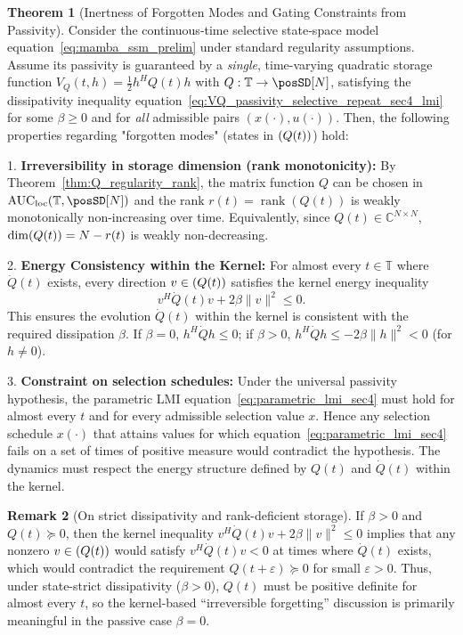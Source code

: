 \documentclass[10pt]{article} %
\def\eqref#1{equation~\ref{#1}}
\newcommand{\timeInt}{\mathbb T}                        %
\newcommand{\loc}{\mathrm{loc}}                         %
\let\ker\relax\DeclareMathOperator{\ker}{Ker}           %
\DeclareMathOperator{\AUC}{AUC}                         %
\DeclareMathOperator{\rank}{rank}                       %
\theoremstyle{definition}
\newtheorem{theorem}{Theorem}[section]
\newtheorem{remark}[theorem]{Remark}
\begin{document}
\begin{theorem}[Inertness of Forgotten Modes and Gating Constraints from Passivity]
\label{thm:kernel_inertness_sec4} %
Consider the continuous‐time selective state‐space model \eqref{eq:mamba_ssm_prelim} under standard regularity assumptions. Assume its passivity is guaranteed by a \emph{single}, time-varying quadratic storage function
$V_Q(t,h) = \frac{1}{2} h^H Q(t) h$
with $Q:\timeInt\to \posSD[N]$,
satisfying the dissipativity inequality \eqref{eq:VQ_passivity_selective_repeat_sec4_lmi}
for some $\beta \ge 0$ and for \emph{all} admissible pairs $(x(\cdot),u(\cdot))$.
Then, the following properties regarding "forgotten modes" (states in $\ker(Q(t))$) hold:

1.  \textbf{Irreversibility in storage dimension (rank monotonicity):}
By Theorem~\ref{thm:Q_regularity_rank}, the matrix function $Q$ can be chosen in
$\AUC_{\loc}(\timeInt,\posSD[N])$ and the rank $r(t)=\rank(Q(t))$ is weakly monotonically
non-increasing over time. Equivalently, since $Q(t)\in\mathbb{C}^{N\times N}$, $\dim\ker(Q(t)) = N - r(t)$ is weakly non-decreasing.

2.  \textbf{Energy Consistency within the Kernel:}
For almost every $t\in\timeInt$ where $\dot Q(t)$ exists, every direction $v\in\ker(Q(t))$
satisfies the kernel energy inequality
    \begin{equation} \label{eq:kernel_energy_balance_sec4} %
    v^H \dot{Q}(t) v + 2\beta \|v\|^2 \le 0.
    \end{equation}
    This ensures the evolution $\dot Q(t)$ within the kernel is consistent with the required dissipation $\beta$. If $\beta=0$, $h^H \dot{Q} h \le 0$; if $\beta>0$, $h^H \dot{Q} h \le -2\beta \|h\|^2 < 0$ (for $h\neq 0$).

3.  \textbf{Constraint on selection schedules:}
Under the universal passivity hypothesis, the parametric LMI \eqref{eq:parametric_lmi_sec4}
must hold for almost every $t$ and for every admissible selection value $x$.
Hence any selection schedule $x(\cdot)$ that attains values for which \eqref{eq:parametric_lmi_sec4}
fails on a set of times of positive measure would contradict the hypothesis. The dynamics must respect the energy structure defined by $Q(t)$ and $\dot{Q}(t)$ within the kernel.
\end{theorem}

\begin{remark}[On strict dissipativity and rank-deficient storage]
If $\beta>0$ and $Q(t)\succeq 0$, then the kernel inequality
$v^H\dot Q(t)v + 2\beta\|v\|^2\le 0$ implies that any nonzero $v\in\ker(Q(t))$ would satisfy
$v^H\dot Q(t)v<0$ at times where $\dot Q(t)$ exists, which would contradict the requirement
$Q(t+\varepsilon)\succeq 0$ for small $\varepsilon>0$.
Thus, under state-strict dissipativity ($\beta>0$), $Q(t)$ must be positive definite for almost every $t$,
so the kernel-based ``irreversible forgetting'' discussion is primarily meaningful in the passive case $\beta=0$.
\end{remark}
\end{document}
